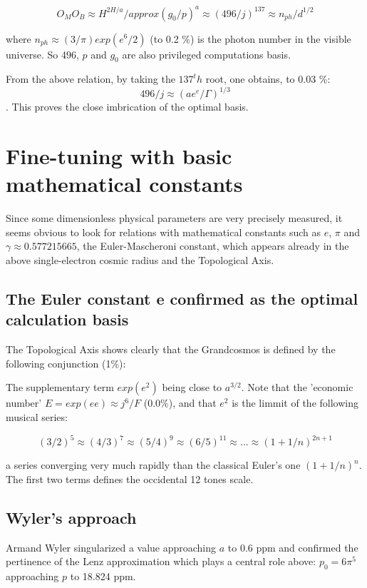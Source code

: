 \documentclass[twoside,draft]{article}
\begin{document}
\begin{sloppypar}
{$$O_MO_B\approx H^{2H/a} /approx (g_0/p)^a \approx (496/j)^137 \approx  n_{ph}/d^{1/2} $$

where $n_{ph}\approx (3/\pi) exp(e^6/2)$ (to 0.2 \%) is the photon number in the visible universe. So 496, $p$ and $g_0$ are also privileged computations basis. 

From the above relation, by taking the $137^th$ root, one obtains, to 0.03 \%: $$496/j \approx (ae^e/\Gamma)^{1/3}$$.
This proves the close imbrication of the optimal basis.

\section{Fine-tuning with basic mathematical constants}
Since some dimensionless physical parameters are very precisely measured, it seems obvious to look for
relations with mathematical constants such as $e$, $\pi$ and $\gamma \approx
0.577215665$, the Euler-Mascheroni constant, which appears already in the above single-electron
cosmic radius and the Topological Axis.

\subsection {The Euler constant e confirmed as the optimal calculation basis}
    The Topological Axis shows clearly that the Grandcosmos is defined by the following conjunction (1\%):




The supplementary term $exp(e^2)$ being close to $a^{3/2}$. Note that the 'economic number' $E = exp(ee)\approx j^6/F$ (0.0\%), and that $e^2$ is the limmit of the following musical series:

$$(3/2)^5 \approx (4/3)^7   \approx (5/4)^9  \approx  (6/5)^{11}  \approx   ...  \approx  (1+1/n)^{2n+1}  $$  

a series converging very much rapidly than the classical Euler's one $(1+1/n)^n$. The first two terms defines the occidental 12 tones scale.


\subsection {Wyler's approach}


Armand Wyler singularized a value approaching $a$ to 0.6 ppm and confirmed the pertinence
of the Lenz approximation which plays a central role above: $p_{0} = 6\pi^{5}$ approaching $p$ to 18.824 ppm.

}
\end{sloppypar}
\end{document}
